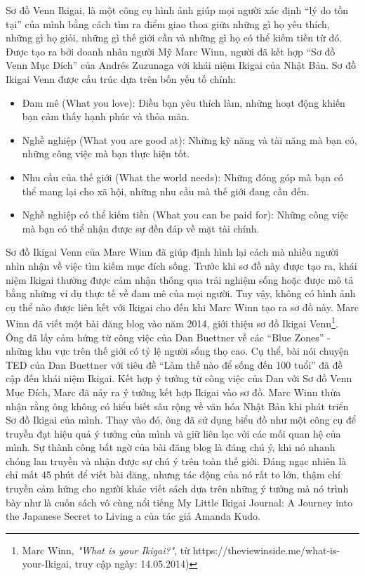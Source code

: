 Sơ đồ Venn Ikigai, là một công cụ hình ảnh giúp mọi người xác định “lý do tồn tại” của mình bằng cách tìm ra điểm giao thoa giữa những gì họ yêu thích, những gì họ giỏi, những gì thế giới cần và những gì họ có thể kiếm tiền từ đó. Được tạo ra bởi doanh nhân người Mỹ Marc Winn, người đã kết hợp “Sơ đồ Venn Mục Đích” của Andrés Zuzunaga với khái niệm Ikigai của Nhật Bản. Sơ đồ Ikigai Venn được cấu trúc dựa trên bốn yếu tố chính:

\begin{itemize}
    \item Đam mê (What you love): Điều bạn yêu thích làm, những hoạt động khiến bạn cảm thấy hạnh phúc và thỏa mãn.
    \item Nghề nghiệp (What you are good at): Những kỹ năng và tài năng mà bạn có, những công việc mà bạn thực hiện tốt.
    \item Nhu cầu của thế giới (What the world needs): Những đóng góp mà bạn có thể mang lại cho xã hội, những nhu cầu mà thế giới đang cần đến.
    \item Nghề nghiệp có thể kiếm tiền (What you can be paid for): Những công việc mà bạn có thể nhận được sự đền đáp về mặt tài chính. 
\end{itemize}

Sơ đồ Ikigai Venn của Marc Winn đã giúp định hình lại cách mà nhiều người nhìn nhận về việc tìm kiếm mục đích sống. Trước khi sơ đồ này được tạo ra, khái niệm Ikigai thường được cảm nhận thông qua trải nghiệm sống hoặc được mô tả bằng những ví dụ thực tế về đam mê của mọi người. Tuy vậy, không có hình ảnh cụ thể nào được liên kết với Ikigai cho đến khi Marc Winn tạo ra sơ đồ này. Marc Winn đã viết một bài đăng blog vào năm 2014, giới thiệu sơ đồ Ikigai Venn\footnote{Marc Winn, \textit{"What is your Ikigai?"}, từ https://theviewinside.me/what-is-your-Ikigai, truy cập ngày: 14.05.2014)}. Ông đã lấy cảm hứng từ công việc của Dan Buettner về các “Blue Zones” - những khu vực trên thế giới có tỷ lệ người sống thọ cao. Cụ thể, bài nói chuyện TED của Dan Buettner với tiêu đề “Làm thế nào để sống đến 100 tuổi” đã đề cập đến khái niệm Ikigai. Kết hợp ý tưởng từ công việc của Dan với Sơ đồ Venn Mục Đích, Marc đã nảy ra ý tưởng kết hợp Ikigai vào sơ đồ. Marc Winn thừa nhận rằng ông không có hiểu biết sâu rộng về văn hóa Nhật Bản khi phát triển Sơ đồ Ikigai của mình. Thay vào đó, ông đã sử dụng biểu đồ như một công cụ để truyền đạt hiệu quả ý tưởng của mình và giữ liên lạc với các mối quan hệ của mình. Sự thành công bất ngờ của bài đăng blog là đáng chú ý, khi nó nhanh chóng lan truyền và nhận được sự chú ý trên toàn thế giới. Đáng ngạc nhiên là chỉ mất 45 phút để viết bài đăng, nhưng tác động của nó rất to lớn, thậm chí truyền cảm hứng cho người khác viết sách dựa trên những ý tưởng mà nó trình bày như là cuốn sách vô cùng nổi tiếng My Little Ikigai Journal: A Journey into the Japanese Secret to Living a của tác giả Amanda Kudo.

